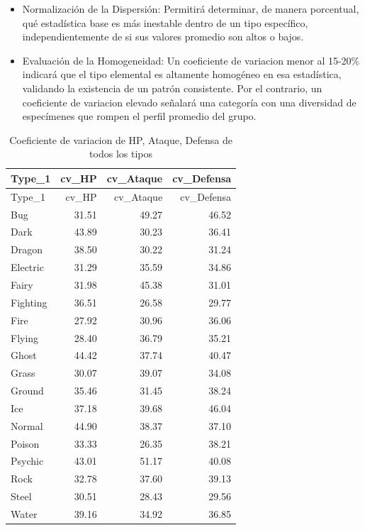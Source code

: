 \documentclass[oneside,11pt]{Latex/Classes/PhDthesisPSnPDF}
\begin{document}
\begin{itemize}

 \item{Normalización de la Dispersión: Permitirá determinar, de manera porcentual, qué estadística base es más inestable dentro de un tipo específico, independientemente de si sus valores promedio son altos o bajos.}
 
\item{Evaluación de la Homogeneidad: Un coeficiente de variacion menor al 15-20\% indicará que el tipo elemental es altamente homogéneo en esa estadística, validando la existencia de un patrón consistente. Por el contrario, un coeficiente de variacion elevado señalará una categoría con una diversidad de especímenes que rompen el perfil promedio del grupo.}

\end{itemize}

\begin{longtable}[]{@{}lrrr@{}}
\caption{Coeficiente de variacion de HP, Ataque, Defensa de todos los
tipos}\tabularnewline
\toprule\noalign{}
Type\_1 & cv\_HP & cv\_Ataque & cv\_Defensa \\
\midrule\noalign{}
\endfirsthead
\toprule\noalign{}
Type\_1 & cv\_HP & cv\_Ataque & cv\_Defensa \\
\midrule\noalign{}
\endhead
\bottomrule\noalign{}
\endlastfoot
Bug & 31.51 & 49.27 & 46.52 \\
Dark & 43.89 & 30.23 & 36.41 \\
Dragon & 38.50 & 30.22 & 31.24 \\
Electric & 31.29 & 35.59 & 34.86 \\
Fairy & 31.98 & 45.38 & 31.01 \\
Fighting & 36.51 & 26.58 & 29.77 \\
Fire & 27.92 & 30.96 & 36.06 \\
Flying & 28.40 & 36.79 & 35.21 \\
Ghost & 44.42 & 37.74 & 40.47 \\
Grass & 30.07 & 39.07 & 34.08 \\
Ground & 35.46 & 31.45 & 38.24 \\
Ice & 37.18 & 39.68 & 46.04 \\
Normal & 44.90 & 38.37 & 37.10 \\
Poison & 33.33 & 26.35 & 38.21 \\
Psychic & 43.01 & 51.17 & 40.08 \\
Rock & 32.78 & 37.60 & 39.13 \\
Steel & 30.51 & 28.43 & 29.56 \\
Water & 39.16 & 34.92 & 36.85 \\
\end{longtable}
\end{document}
